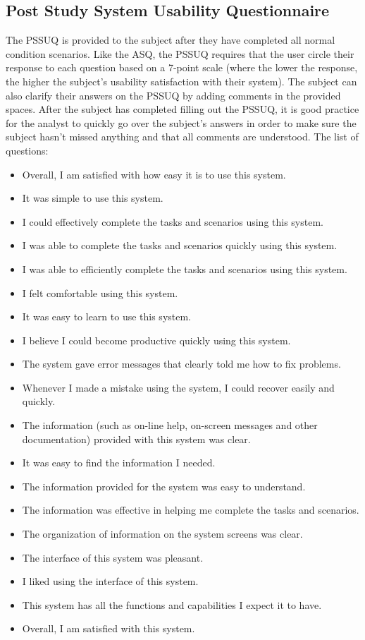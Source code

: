 \subsection{Post Study System Usability Questionnaire}
The PSSUQ is provided to the subject after they have completed all normal condition scenarios. Like the ASQ, the PSSUQ requires that the user circle their response to each question based on a 7-point scale (where the lower the response, the higher the subject’s usability satisfaction with their system). The subject can also clarify their answers on the PSSUQ by adding comments in the provided spaces.
After the subject has completed filling out the PSSUQ, it is good practice for the analyst to quickly go over the subject’s answers in order to make sure the subject hasn’t missed anything and that all comments are understood.
The list of questions:
\begin{itemize}
	\item Overall, I am satisfied with how easy it is to use this system.
	\item It was simple to use this system.
	\item I could effectively complete the tasks and scenarios using this system.
	\item I was able to complete the tasks and scenarios quickly using this system.
	\item I was able to efficiently complete the tasks and scenarios using this system.
	\item I felt comfortable using this system.
	\item It was easy to learn to use this system.
	\item I believe I could become productive quickly using this system.
	\item The system gave error messages that clearly told me how to fix problems.
	\item Whenever I made a mistake using the system, I could recover easily and quickly.
	\item The information (such as on-line help, on-screen messages and other documentation) provided with this system was clear.
	\item It was easy to find the information I needed.
	\item The information provided for the system was easy to understand.
	\item The information was effective in helping me complete the tasks and scenarios.
	\item The organization of information on the system screens was clear.
	\item The interface of this system was pleasant.
	\item I liked using the interface of this system.
	\item This system has all the functions and capabilities I expect it to have.
	\item Overall, I am satisfied with this system.
\end{itemize}
